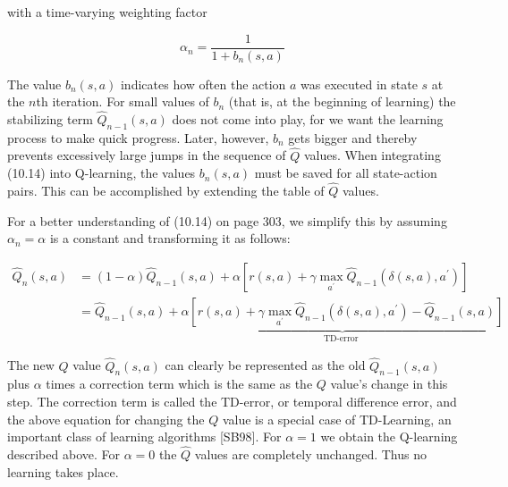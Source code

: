 \documentclass[10pt]{book}
\begin{document}
\begin{center}
\begin{enumerate}
\begin{center}
\begin{center}
\begin{center}
\begin{center}
\begin{center}
with a time-varying weighting factor

$$
\alpha_{n}=\frac{1}{1+b_{n}(s, a)}
$$

The value $b_{n}(s, a)$ indicates how often the action $a$ was executed in state $s$ at the $n$th iteration. For small values of $b_{n}$ (that is, at the beginning of learning) the stabilizing term $\hat{Q}_{n-1}(s, a)$ does not come into play, for we want the learning process to make quick progress. Later, however, $b_{n}$ gets bigger and thereby prevents excessively large jumps in the sequence of $\hat{Q}$ values. When integrating (10.14) into Q-learning, the values $b_{n}(s, a)$ must be saved for all state-action pairs. This can be accomplished by extending the table of $\hat{Q}$ values.

For a better understanding of (10.14) on page 303, we simplify this by assuming $\alpha_{n}=\alpha$ is a constant and transforming it as follows:


$$
\begin{aligned}
\hat{Q}_{n}(s, a) & =(1-\alpha) \hat{Q}_{n-1}(s, a)+\alpha\left[r(s, a)+\gamma \max _{a^{\prime}} \hat{Q}_{n-1}\left(\delta(s, a), a^{\prime}\right)\right] \\
& =\hat{Q}_{n-1}(s, a)+\underbrace{\alpha\left[r(s, a)+\gamma \max _{a^{\prime}} \hat{Q}_{n-1}\left(\delta(s, a), a^{\prime}\right)-\hat{Q}_{n-1}(s, a)\right]}_{\text {TD-error }}
\end{aligned}
$$

The new $Q$ value $\hat{Q}_{n}(s, a)$ can clearly be represented as the old $\hat{Q}_{n-1}(s, a)$ plus $\alpha$ times a correction term which is the same as the $Q$ value's change in this step. The correction term is called the TD-error, or temporal difference error, and the above equation for changing the $Q$ value is a special case of TD-Learning, an important class of learning algorithms [SB98]. For $\alpha=1$ we obtain the Q-learning described above. For $\alpha=0$ the $\hat{Q}$ values are completely unchanged. Thus no learning takes place.


\end{center}
\end{center}
\end{center}
\end{center}
\end{center}
\end{enumerate}
\end{center}
\end{document}
